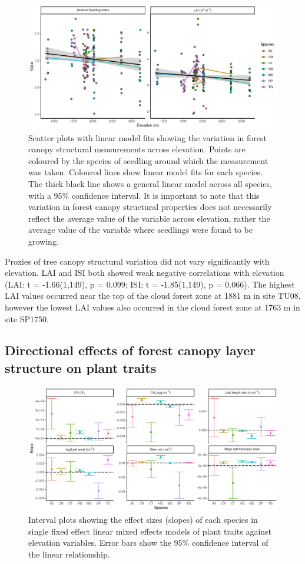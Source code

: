 \documentclass[a4paper, 11pt]{article}
\begin{document}
\begin{figure}[H]
\includegraphics[width=\textwidth]{comp_elev}
\centering
\caption{Scatter plots with linear model fits showing the variation in forest canopy structural measurements across elevation. Points are coloured by the species of seedling around which the measurement was taken. Coloured lines show linear model fits for each species. The thick black line shows a general linear model across all species, with a 95\% confidence interval. It is important to note that this variation in forest canopy structural properties does not necessarily reflect the average value of the variable across elevation, rather the average value of the variable where seedlings were found to be growing.}
\label{comp_elev}
\end{figure}

Proxies of tree canopy structural variation did not vary significantly with elevation. LAI and ISI both showed weak negative correlations with elevation (LAI: t = -1.66(1,149), p = 0.099; ISI: t = -1.85(1,149), p = 0.066). The highest LAI values occurred near the top of the cloud forest zone at 1881 m in site TU08, however the lowest LAI values also occurred in the cloud forest zone at 1763 m in site SP1750.

\subsection{Directional effects of forest canopy layer structure on plant traits}

\begin{figure}[H]
\includegraphics[width=\textwidth]{traits_elev_slopes}
\centering
\caption{Interval plots showing the effect sizes (slopes) of each species in single fixed effect linear mixed effects models of plant traits against elevation variables. Error bars show the 95\% confidence interval of the linear relationship.}
\label{traits_elev_slopes}
\end{figure}
\end{document}
